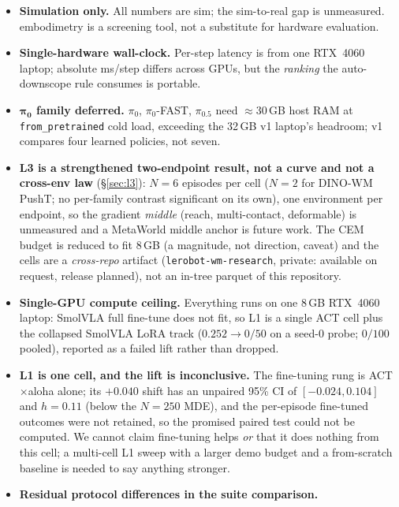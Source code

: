 \documentclass[10pt]{article}
\begin{document}
\begin{itemize}\setlength{\itemsep}{0pt}\setlength{\parskip}{0pt}\setlength{\topsep}{0pt}\setlength{\partopsep}{0pt}
    \item \textbf{Simulation only.} All numbers are sim; the sim-to-real
    gap is unmeasured. embodimetry is a screening tool, not a
    substitute for hardware evaluation.
    \item \textbf{Single-hardware wall-clock.} Per-step latency is from
    one RTX~4060 laptop; absolute ms/step differs across GPUs, but the
    \emph{ranking} the auto-downscope rule consumes is portable.
    \item \textbf{$\boldsymbol{\pi_0}$ family deferred.} $\pi_0$,
    $\pi_0$-FAST, $\pi_{0.5}$ need ${\approx}30$\,GB host
    RAM at \texttt{from\_pretrained} cold load,
    exceeding the 32\,GB v1 laptop's headroom; v1 compares four learned
    policies, not seven.
    \item \textbf{L3 is a strengthened two-endpoint result, not a curve and
    not a cross-env law} (\S\ref{sec:l3}): $N{=}6$ episodes per cell
    ($N{=}2$ for DINO-WM PushT; no per-family
    contrast significant on its own), one environment per
    endpoint, so
    the gradient \emph{middle} (reach, multi-contact, deformable) is
    unmeasured and a MetaWorld middle anchor is future work. The CEM budget
    is reduced to fit 8\,GB (a magnitude, not direction, caveat) and the
    cells are a
    \emph{cross-repo} artifact (\texttt{lerobot-wm-research}, private:
    available on request, release planned), not an
    in-tree parquet of this repository.
    \item \textbf{Single-GPU compute ceiling.} Everything runs on
    one 8\,GB RTX~4060 laptop: SmolVLA
    full fine-tune does not fit, so L1 is a single ACT cell plus the
    collapsed SmolVLA LoRA track ($0.252\to0/50$ on a
    seed-0 probe; $0/100$ pooled),
    reported as a failed lift rather than dropped.
    \item \textbf{L1 is one cell, and the lift is inconclusive.} The
    fine-tuning rung is ACT$\times$aloha alone; its $+0.040$ shift has an
    unpaired 95\% CI of $[-0.024, 0.104]$ and $h{=}0.11$ (below the
    $N{=}250$ MDE), and the per-episode fine-tuned outcomes were not
    retained, so the promised paired test could not be computed. We
    cannot claim fine-tuning helps \emph{or} that it does nothing from
    this cell; a
    multi-cell L1 sweep with a larger demo budget and a from-scratch
    baseline is needed to say anything stronger.
    \item \textbf{Residual protocol differences in the suite comparison.}

\end{itemize}
\end{document}
